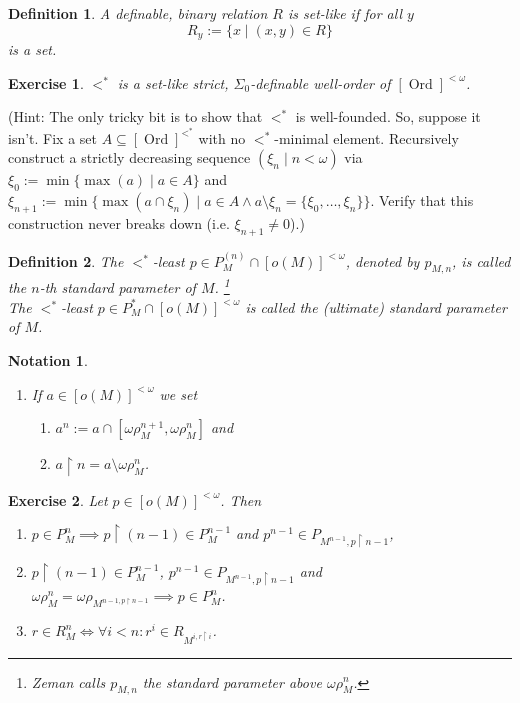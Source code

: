 \documentclass[12pt,a4paper]{article}
\theoremstyle{nicestyle}
\newtheorem{exercise}{Exercise}[subsection]
\newtheorem{definition}{Definition}[subsection]
\newtheorem{notation}{Notation}[subsection]
\DeclareMathOperator{\ord}{Ord}
\begin{document}
  \begin{definition}
    A definable, binary relation $R$ is \emph{set-like} if for all $y$
    \[
      R_{y} := \{ x \mid (x,y) \in R \} 
    \]
    is a set.
  \end{definition}

  \begin{exercise}
    $<^{*}$ is a set-like strict, $\Sigma_{0}$-definable well-order of
    $[\ord]^{< \omega}$.
  \end{exercise}

  (Hint: The only tricky bit is to show that $<^{*}$ is
  well-founded. So, suppose it isn't. Fix a set
  $A \subseteq [\ord]^{<^{*}}$ with no $<^{*}$-minimal
  element. Recursively construct a strictly decreasing sequence
  $(\xi_{n} \mid n < \omega)$ via
  $\xi_{0} := \min \{ \max(a) \mid a \in A \}$ and
  $\xi_{n+1} := \min \{ \max(a \cap \xi_{n}) \mid a \in A \wedge a
  \setminus \xi_{n} = \{ \xi_{0}, \ldots, \xi_{n} \}\}$. Verify that
  this construction never breaks down (i.e. $\xi_{n+1} \neq 0$).)

  \begin{definition}
    The $<^{*}$-least $p \in P^{(n)}_{M} \cap [o(M)]^{< \omega}$,
    denoted by $p_{M,n}$, is called the \emph{$n$-th standard
      parameter of
      $M$}. \footnote{Zeman calls $p_{M,n}$ the standard parameter above $\omega \rho^{n}_{M}$.} \\
    The $<^{*}$-least $p \in P^{*}_{M} \cap [o(M)]^{<\omega}$ is
    called the \emph{(ultimate) standard parameter of $M$}.
  \end{definition}

    \begin{notation}
    \begin{enumerate}
    \item If $a \in [o(M)]^{< \omega}$ we set
      \begin{enumerate}
      \item $a^{n} := a \cap [ \omega\rho^{n+1}_{M}, \omega\rho^{n}_{M}]$ and
      \item $a \restriction n = a \setminus \omega\rho^{n}_{M}$.
      \end{enumerate}
    \end{enumerate}
  \end{notation}
  
  \begin{exercise} \label{exercise: manipulation of standard parameters}
    Let $p \in [o(M)]^{<\omega}$. Then
    \begin{enumerate}
    \item
      $p \in P^{n}_{M} \implies p \restriction (n-1) \in P^{n-1}_{M}$
      and $p^{n-1} \in P_{M^{n-1}, p \restriction n-1}$,
    \item $p \restriction (n-1) \in P^{n-1}_{M}$,
      $p^{n-1} \in P_{M^{n-1}, p \restriction n-1}$ and
      $\omega\rho^{n}_{M} = \omega\rho_{M^{n-1, p \restriction n -1}}
      \implies p \in P^{n}_{M}$.
    \item
      $r \in R^{n}_{M} \iff \forall i < n \colon r^{i} \in R_{M^{i, r
          \restriction i}}$.
    \end{enumerate}

  \end{exercise}
\end{document}
